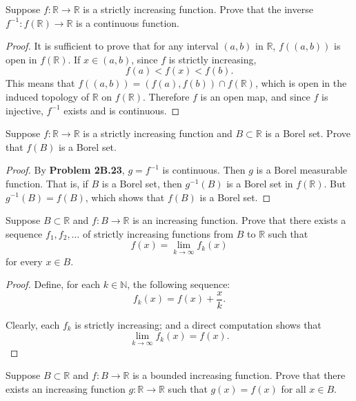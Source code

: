 \documentclass[14.5pt]{article}
\newcommand{\N}{\mathbb{N}}
\newcommand{\R}{\mathbb{R}}
\newenvironment{problem}[2][Problem]{\begin{mdframed}[backgroundcolor=gray!10, leftline = false, rightline=false, linewidth=0.25pt]  \begin{trivlist}
\item[\hskip \labelsep {\bfseries #1}\hskip \labelsep {\bfseries #2.}]}{\end{trivlist} \end{mdframed}  }
\begin{document}
\begin{problem}{2B.23}
Suppose $f : \R \rightarrow \R$ is a strictly increasing function. Prove that the inverse $f^{-1}: f(\R) \rightarrow \R$ is a continuous function. 
\end{problem}
\begin{proof}
    It is sufficient to prove that for any interval $(a,b)$ in $\R$, $f((a,b))$ is open in $f(\R).$ If $x \in (a,b)$, since $f$ is strictly increasing, 
    $$f(a) < f(x) < f(b).$$
    This means that $f((a,b)) = (f(a), f(b)) \cap f(\R)$, which is open in the induced topology of $\R$ on $f(\R).$ Therefore $f$ is an open map, and since $f$ is injective, $f^{-1}$ exists and is continuous.
\end{proof}

\begin{problem}{2B.24}
Suppose $f : \R \rightarrow \R$ is a strictly increasing function and $B \subset \R$ is a Borel set. Prove that $f(B)$ is a Borel set.
\end{problem}
\begin{proof}
    By \textbf{Problem 2B.23}, $g = f^{-1}$ is continuous. Then $g$ is a Borel measurable function. That is, if $B$ is a Borel set, then $g^{-1}(B)$ is a Borel set in $f(\R).$ But $g^{-1}(B) = f(B)$, which shows that $f(B)$ is a Borel set. 
\end{proof}

\begin{problem}{2B.25}
Suppose $B \subset \R$ and $f : B \rightarrow \R$ is an increasing function. Prove that there exists a sequence $f_1, f_2, \ldots$ of strictly increasing functions from $B$ to $\R$ such that
$$ f(x) = \lim_{k \to \infty} f_k(x)$$
for every $x \in B.$
\end{problem}
\begin{proof}
Define, for each $k\in \N$, the following sequence:
$$f_k(x) = f(x) + \frac{x}{k}.$$

Clearly, each $f_k$ is strictly increasing; and a direct computation shows that 
$$\lim_{k \to \infty} f_k(x) = f(x).$$
\end{proof}

\begin{problem}{2B.26}
Suppose $B \subset \R$ and $f : B \rightarrow \R$ is a bounded increasing function. Prove that there exists an increasing function $g: \R \rightarrow \R$ such that $g(x) = f (x)$ for all $x \in B$.
\end{problem}
\end{document}
